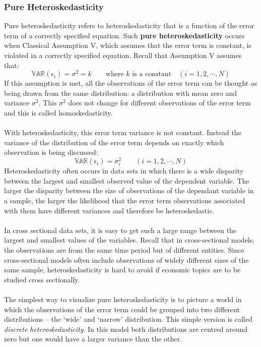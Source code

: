 \documentclass[11pt]{article}
\begin{document}
\subsubsection{Pure Heteroskedasticity}
Pure heteroskedasticity refers to heteroskedasticity that is a function of the error term of a correctly specified equation. Such \textbf{pure heteroskedasticity} occurs when Classical Assumption V, which assumes that the error term is constant, is violated in a correctly specified equation. Recall that Assumption V assumes that:
\begin{equation}
\mathbb{VAR}(\epsilon_i) = \sigma^2 = k \quad\quad\text{where } k \text{ is a constant}\quad (i=1, 2, \cdots, N)\label{eg10_1}
\end{equation}
If this assumption is met, all the observations of the error term can be thought as being drawn from the same distribution: a distribution with mean zero and variance $\sigma^2$. This $\sigma^2$ does not change for different observations of the error term and this is called homoskedasticity.\\ \\
With heteroskedasticity, this error term variance is not constant. Instead the variance of the distribution of the error term depends on exactly which observation is being discussed:
\begin{equation}
\mathbb{VAR}(\epsilon_i) = \sigma^2_i \quad\quad (i=1, 2, \cdots, N)\label{eg10_2}
\end{equation}
Heteroskedasticity often occurs in data sets in which there is a wide disparity between the largest and smallest observed value of the dependent variable. The larger the disparity between the size of observations of the dependant variable in a sample, the larger the likelihood that the error term observations associated with them have different variances and therefore be heteroskedastic. \\ \\
In cross sectional data sets, it is easy to get such a large range between the largest and smallest values of the variables. Recall that in cross-sectional models, the observations are from the same time period but of different entities. Since cross-sectional models often include observations of widely different sizes of the same sample, heteroskedasticity is hard to avoid if economic topics are to be studied cross sectionally.\\ \\
The simplest way to visualize pure heteroskedasticity is to picture a world in which the observations of the error term could be grouped into two different distributions -- the `wide' and `narrow' distribution. This simple version is called \textit{discrete heteroskedasticity}. In this model both distributions are centred around zero but one would have a larger variance than the other.\\ \\
\end{document}
